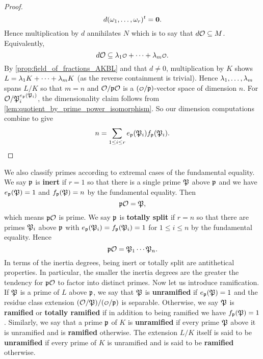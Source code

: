 \begin{proof}
      \[
        d(\omega_{1},\ldots,\omega_{r})^{t} = \mathbf{0}.
      \]
      Hence multiplication by $d$ annihilates $N$ which is to say that $d\mathcal{O} \subseteq M$. Equivalently,
      \[
        d\mc{O} \subseteq \l_{1}\smc{O}+\cdots+\l_{m}\smc{O}.
      \]
      By \cref{prop:field_of_fractions_AKBL} and that $d \neq 0$, multiplication by $K$ shows $L = \lambda_{1}K+\cdots+\lambda_{m}K$ (as the reverse containment is trivial). Hence $\lambda_{1},\ldots,\lambda_{m}$ spans $L/K$ so that $m = n$ and $\mathcal{O}/\mathfrak{p}\mathcal{O}$ is a $(\smc{O}/\mf{p})$-vector space of dimension $n$. For $\mathcal{O}/\mathfrak{P}_{i}^{e_{\mathfrak{p}}(\mathfrak{P}_{i})}$, the dimensionality claim follows from \cref{lem:quotient_by_prime_power_isomorphism}. So our dimension computations combine to give
      \[
        n = \sum_{1 \le i \le r}e_{\mathfrak{p}}(\mathfrak{P}_{i})f_{\mathfrak{p}}(\mathfrak{P}_{i}).
      \]
    \end{proof}

    We also classify primes according to extremal cases of the fundamental equality. We say $\mathfrak{p}$ is \textbf{inert} if $r = 1$ so that there is a single prime $\mathfrak{P}$ above $\mathfrak{p}$ and we have $e_{\mathfrak{p}}(\mathfrak{P}) = 1$ and $f_{\mathfrak{p}}(\mathfrak{P}) = n$ by the fundamental equality. Then
    \[
      \mathfrak{p}\mathcal{O} = \mathfrak{P},
    \]
    which means $\mathfrak{p}\mathcal{O}$ is prime. We say $\mathfrak{p}$ is \textbf{totally split} if $r = n$ so that there are primes $\mathfrak{P}_{i}$ above $\mathfrak{p}$ with $e_{\mathfrak{p}}(\mathfrak{P}_{i}) = f_{\mathfrak{p}}(\mathfrak{P}_{i}) = 1$ for $1 \le i \le n$ by the fundamental equality. Hence
    \[
      \mathfrak{p}\mathcal{O} = \mathfrak{P}_{1} \cdots \mathfrak{P}_{n}.
    \]
    In terms of the inertia degrees, being inert or totally split are antithetical properties. In particular, the smaller the inertia degrees are the greater the tendency for $\mathfrak{p}\mathcal{O}$ to factor into distinct primes. Now let us introduce ramification. If $\mathfrak{P}$ is a prime of $L$ above $\mathfrak{p}$, we say that $\mathfrak{P}$ is \textbf{unramified} if $e_{\mathfrak{p}}(\mathfrak{P}) = 1$ and the residue class extension $(\mc{O}/\mf{P})/(\smc{O}/\mf{p})$ is separable. Otherwise, we say $\mathfrak{P}$ is \textbf{ramified} or \textbf{totally ramified} if in addition to being ramified we have $f_{\mathfrak{p}}(\mathfrak{P}) = 1$. Similarly, we say that a prime $\mathfrak{p}$ of $K$ is \textbf{unramified} if every prime $\mathfrak{P}$ above it is unramified and is \textbf{ramified} otherwise. The extension $L/K$ itself is said to be \textbf{unramified} if every prime of $K$ is unramified and is said to be \textbf{ramified} otherwise.

